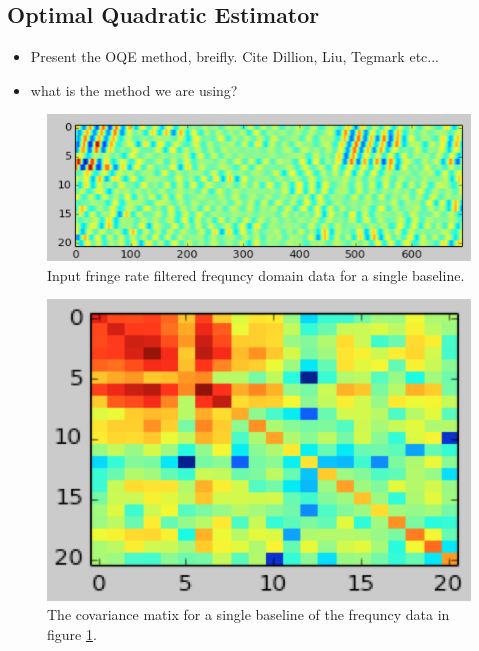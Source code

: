 \documentclass[twocolumn,numberedappendix]{emulateapj}
\begin{document}
{\subsection{Optimal Quadratic Estimator}
\begin{itemize}
    \item{Present the OQE method, breifly. Cite Dillion, Liu, Tegmark etc...}
    \item{what is the method we are using?}
\end{itemize}

\begin{figure}[h!]\centering
\includegraphics[width=2\columnwidth, height=.8\columnwidth]{plots/x_example.png}
\caption{Input fringe rate filtered frequncy domain data for a single baseline.}
\label{fig:x_example}
\end{figure}

\begin{figure}[h!]\centering
\includegraphics[width=\columnwidth, height=.8\columnwidth]{plots/C_example.png}
\caption{The covariance matix for a single baseline of the frequncy data in
figure \ref{fig:x_example}.} 
\label{fig:C_example}
\end{figure}

}
\end{document}
